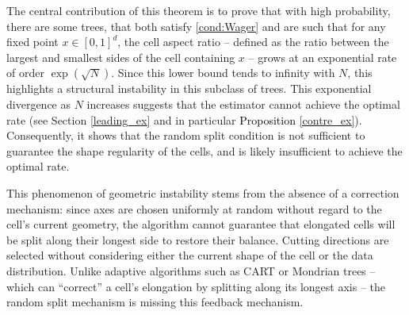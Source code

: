 \documentclass[paper=a4, fontsize=11pt]{scrartcl}
\newcommand{\rev}[1]{\textcolor{black}{#1}}
\begin{document}



The central contribution of this theorem is to prove that with high probability, there are some trees, that both satisfy \ref{cond:Wager} and are such that for any fixed point $x \in [0,1]^d$, the cell aspect ratio -- defined as the ratio between the largest and smallest sides of the cell containing $x$ -- grows at an exponential rate of order $\exp(\sqrt{N})$. Since this lower bound tends to infinity with $N$, this highlights a structural instability in this subclass of trees. This exponential divergence as $N$ increases suggests that the estimator cannot achieve the optimal rate (see Section \ref{leading_ex} and in particular \rev{Proposition} \ref{contre_ex}). Consequently, it shows that the random split condition is not sufficient to guarantee the shape regularity of the cells, and is likely insufficient to achieve the optimal rate.



This phenomenon of geometric instability stems from the absence of a correction mechanism: since axes are chosen uniformly at random without regard to the cell's current geometry, the algorithm cannot guarantee that elongated cells will be split along their longest side to restore their balance. Cutting directions are selected without considering either the current shape of the cell or the data distribution. Unlike adaptive algorithms such as CART or Mondrian trees -- which can ``correct'' a cell's elongation by splitting along its longest axis -- the random split mechanism is missing this feedback mechanism. %

\end{document}
